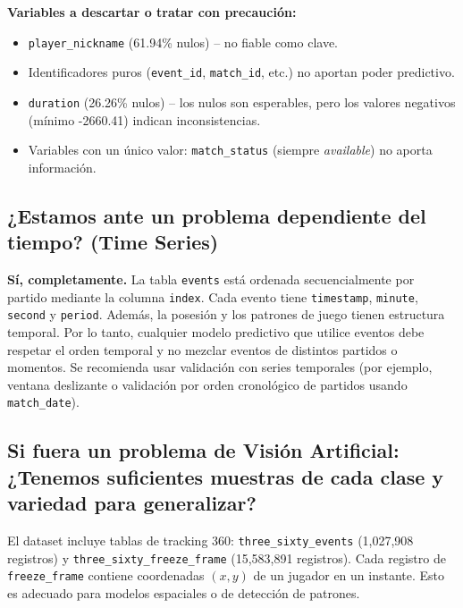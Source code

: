 \documentclass[12pt,a4paper]{article}
\begin{document}
\textbf{Variables a descartar o tratar con precaución:}

\begin{itemize}
    \item \texttt{player\_nickname} (61.94\% nulos) – no fiable como clave.
    \item Identificadores puros (\texttt{event\_id}, \texttt{match\_id}, etc.) no aportan poder predictivo.
    \item \texttt{duration} (26.26\% nulos) – los nulos son esperables, pero los valores negativos (mínimo -2660.41) indican inconsistencias.
    \item Variables con un único valor: \texttt{match\_status} (siempre \emph{available}) no aporta información.
\end{itemize}

\subsection{¿Estamos ante un problema dependiente del tiempo? (Time Series)}

\textbf{Sí, completamente.} La tabla \texttt{events} está ordenada secuencialmente por partido mediante la columna \texttt{index}. Cada evento tiene \texttt{timestamp}, \texttt{minute}, \texttt{second} y \texttt{period}. Además, la posesión y los patrones de juego tienen estructura temporal. Por lo tanto, cualquier modelo predictivo que utilice eventos debe respetar el orden temporal y no mezclar eventos de distintos partidos o momentos. Se recomienda usar validación con series temporales (por ejemplo, ventana deslizante o validación por orden cronológico de partidos usando \texttt{match\_date}).

\subsection{Si fuera un problema de Visión Artificial: ¿Tenemos suficientes muestras de cada clase y variedad para generalizar?}

El dataset incluye tablas de tracking 360: \texttt{three\_sixty\_events} (1,027,908 registros) y \texttt{three\_sixty\_freeze\_frame} (15,583,891 registros). Cada registro de \texttt{freeze\_frame} contiene coordenadas \((x, y)\) de un jugador en un instante. Esto es adecuado para modelos espaciales o de detección de patrones.
\end{document}
